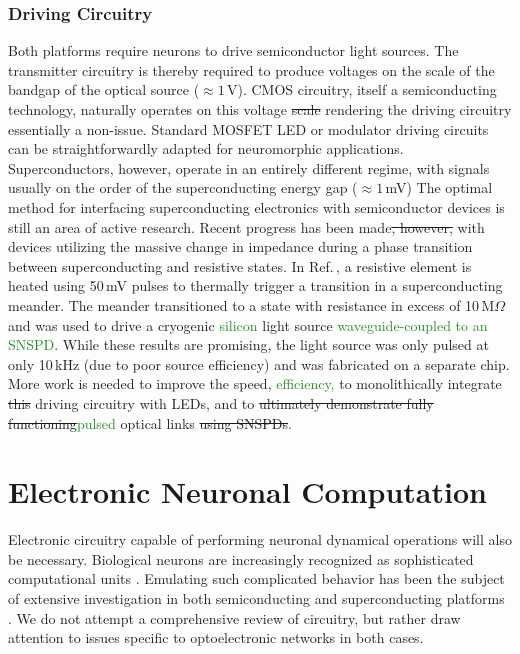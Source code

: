 \documentclass[twocolumn]{article}
\begin{document}
\subsubsection{Driving Circuitry}
Both platforms require neurons to drive semiconductor light sources. The transmitter circuitry is thereby required to produce voltages on the scale of the bandgap of the optical source ($\approx 1$\,V). CMOS circuitry, itself a semiconducting technology, naturally operates on this voltage \sout{scale} rendering the driving circuitry essentially a non-issue. Standard MOSFET LED or modulator driving circuits \cite{bowers2016recent,LED reference?} can be straightforwardly adapted for neuromorphic applications. Superconductors, however, operate in an entirely different regime, with signals usually on the order of the superconducting energy gap ($\approx 1$\,mV) The optimal method for interfacing superconducting electronics with semiconductor devices is still an area of active research. Recent progress has been made\sout{, however,} with devices utilizing the massive change in impedance during a phase transition between superconducting and resistive states. In Ref.\,\cite{mccaughan2019superconducting}, a resistive element is heated using 50\,mV pulses to thermally trigger a transition in a superconducting meander. The meander transitioned to a state with resistance in excess of 10\,M$\Omega$ and was used to drive a cryogenic \textcolor{ForestGreen}{silicon} light source \textcolor{ForestGreen}{waveguide-coupled to an SNSPD}. While these results are promising, the light source was only pulsed at only 10\,kHz (due to poor source efficiency) and was fabricated on a separate chip. More work is needed to improve the speed, \textcolor{ForestGreen}{efficiency, }to monolithically integrate \sout{this} driving circuitry with LEDs, and to \sout{ultimately demonstrate fully functioning}\textcolor{ForestGreen}{pulsed} optical links \sout{using SNSPDs}.

\section{\label{sec:soma}Electronic Neuronal Computation}
Electronic circuitry capable of performing neuronal dynamical operations will also be necessary. Biological neurons are increasingly recognized as sophisticated computational units \cite{kose2000,stsp2015,haah2016,sava2017}. Emulating such complicated behavior has been the subject of extensive investigation in both semiconducting \cite{voma2007,indiveri2011neuromorphic,pfgr2013,brha2013,bega2014,abta2019} and superconducting platforms \cite{shainline2019fluxonic}. We do not attempt a comprehensive review of circuitry, but rather draw attention to issues specific to optoelectronic networks in both cases.
\end{document}
